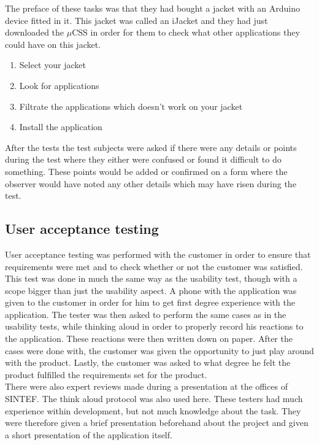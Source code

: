 			The preface of these tasks was that they had bought a jacket with an Arduino device fitted in it. This jacket was called an iJacket and they had just downloaded the $\mu$CSS in order for them to check what other applications they could have on this jacket.

			\vspace{6 mm}
			\begin{enumerate}
			 \item Select your jacket
			 \item Look for applications
			 \item Filtrate the applications which doesn't work on your jacket
			 \item Install the application
			\end{enumerate}
			\vspace{6 mm}

			After the tests the test subjects were asked if there were any details or points during the test where they either were confused or found it difficult to do something. These points would be added or confirmed on a form where the observer would have noted any other details which may have risen during the test.

		\subsection{User acceptance testing}
		User acceptance testing was performed with the customer in order to ensure that requirements were met and to check whether or not the customer was satisfied. This test was done in much the same way as the usability test, though with a scope bigger than just the usability aspect. A phone with the application was given to the customer in order for him to get first degree experience with the application. The tester was then asked to perform the same cases as in the usability tests, while thinking aloud in order to properly record his reactions to the application. These reactions were then written down on paper. After the cases were done with, the customer was given the opportunity to just play around with the product. Lastly, the customer was asked to what degree he felt the product fulfilled the requirements set for the product.\\
		\newline
		There were also expert reviews made during a presentation at the offices of SINTEF. The think aloud protocol was also used here. These testers had much experience within development, but not much knowledge about the task. They were therefore given a brief presentation beforehand about the project and given a short presentation of the application itself.\\


